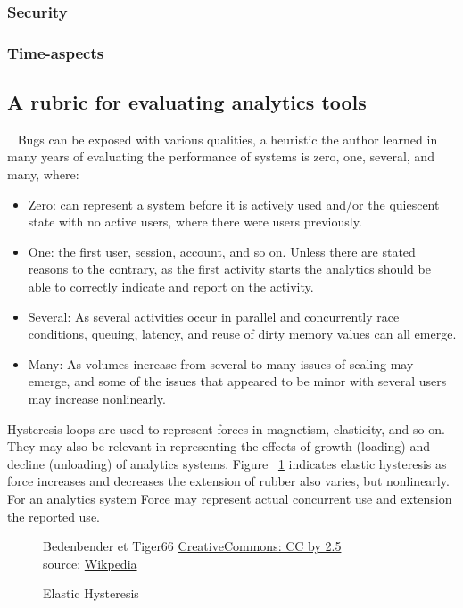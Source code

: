 \subsubsection{Security}

\subsubsection{Time-aspects}

\subsection{A rubric for evaluating analytics tools}~\label{rubric-for-evaluating-analytics-tools}
Bugs can be exposed with various qualities, a heuristic the author learned in many years of evaluating the performance of systems is zero, one, several, and many, where:
\begin{itemize}
    \item Zero: can represent a system before it is actively used and/or the quiescent state with no active users, where there were users previously.
    \item One: the first user, session, account, and so on. Unless there are stated reasons to the contrary, as the first activity starts the analytics should be able to correctly indicate and report on the activity.
    \item Several: As several activities occur in parallel and concurrently race conditions, queuing, latency, and reuse of dirty memory values can all emerge.
    \item Many: As volumes increase from several to many issues of scaling may emerge, and some of the issues that appeared to be minor with several users may increase nonlinearly. 
\end{itemize}

Hysteresis loops are used to represent forces in magnetism, elasticity, and so on. They may also be relevant in representing the effects of growth (loading) and decline (unloading) of analytics systems. Figure ~\ref{fig:elastic-hysteresis} indicates elastic hysteresis as force increases and decreases the extension of rubber also varies, but nonlinearly. For an analytics system Force may represent actual concurrent use and extension the reported use.

\begin{figure}[!htbp]
    \centering
    \copyrightbox[r]{
        }
    {\textcopyright Bedenbender et Tiger66 \href{{https://creativecommons.org/licenses/by/2.5}}{CreativeCommons: CC by 2.5}\\source: \href{https://commons.wikimedia.org/wiki/File:Elastic_Hysteresis.svg}{Wikpedia}}
    \caption{Elastic Hysteresis}
    \label{fig:elastic-hysteresis}
\end{figure}


